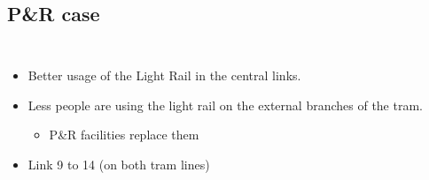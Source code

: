 \documentclass{EESD}
\begin{document}
\subsection{P\&R case}
\begin{frame}{}
\begin{columns}
	\centering
	\resizebox{!}{\textheight}{}

	\centering
	\resizebox{!}{\textheight}{}
\end{columns}
\end{frame}


\begin{frame}{}
\begin{columns}
	\centering
	\resizebox{!}{\textheight}{}
	\centering
	\resizebox{!}{\textheight}{}
\end{columns}
\end{frame}

\begin{frame}{}
\begin{columns}
	\centering
	\resizebox{!}{\textheight}{}
	\begin{itemize}
		\item Better usage of the Light Rail in the central links.
		\item Less people are using the light rail on the external branches of the tram.\begin{itemize}
			\item[\textrightarrow] P\&R facilities replace them
		\end{itemize}
		\item Link 9 to 14 (on both tram lines)
	\end{itemize}
\end{columns}
\end{frame}
\end{document}
